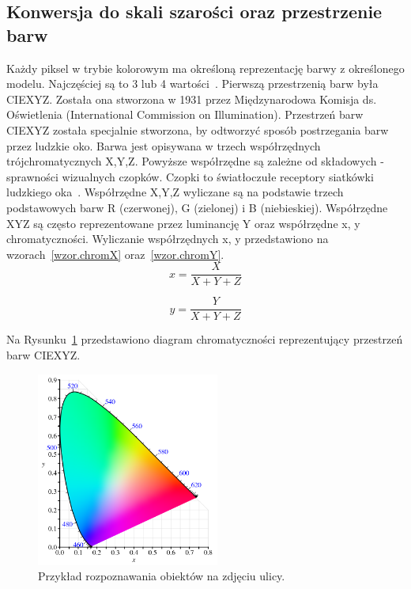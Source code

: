 \documentclass[a4paper,twoside,12pt]{book}
\begin{document}
    \subsection{Konwersja do skali szarości oraz przestrzenie barw}\label{subsec:konwersja-do-skali-szarości-oraz-przestrzenie-barw}
    Każdy piksel w trybie kolorowym ma określoną reprezentację barwy z określonego modelu.
    Najczęściej są to 3 lub 4 wartości~\cite{przestrzenieKolorow}.
    Pierwszą przestrzenią barw była CIEXYZ. Została ona stworzona w 1931 przez
    Międzynarodowa Komisja ds. Oświetlenia (International Commission on Illumination).
    Przestrzeń barw CIEXYZ została specjalnie stworzona, by odtworzyć sposób postrzegania barw przez ludzkie oko.
    Barwa jest opisywana w trzech współrzędnych trójchromatycznych X,Y,Z.
    Powyższe współrzędne są zależne od składowych - sprawności wizualnych czopków.
    Czopki to światłoczułe receptory siatkówki ludzkiego oka~\cite{przestrzenieKolorow}.
    Współrzędne X,Y,Z wyliczane są na podstawie trzech podstawowych barw R (czerwonej),
    G (zielonej) i B (niebieskiej).
    Współrzędne XYZ są często reprezentowane przez luminancję Y oraz współrzędne x, y chromatyczności.
    Wyliczanie współrzędnych x, y przedstawiono na wzorach~\ref{wzor.chromX} oraz~\ref{wzor.chromY}.
    \large
    \begin{equation}
        x = \frac{X}{X+Y+Z}
        \label{wzor.chromX}
    \end{equation}
    \normalsize

    \large
    \begin{equation}
        y = \frac{Y}{X+Y+Z}
        \label{wzor.chromY}
    \end{equation}
    \normalsize

    Na Rysunku~\ref{fig.CIEXYZ} przedstawiono diagram chromatyczności reprezentujący przestrzeń barw CIEXYZ.

    \begin{figure}
        \centering
        \includegraphics[width=6cm]{Obrazy/CIEXYZ.jpg}
        \caption{Przykład rozpoznawania obiektów na zdjęciu ulicy.~\cite{diagramCIEXYZ}}
        \label{fig.CIEXYZ}
    \end{figure}
\end{document}
